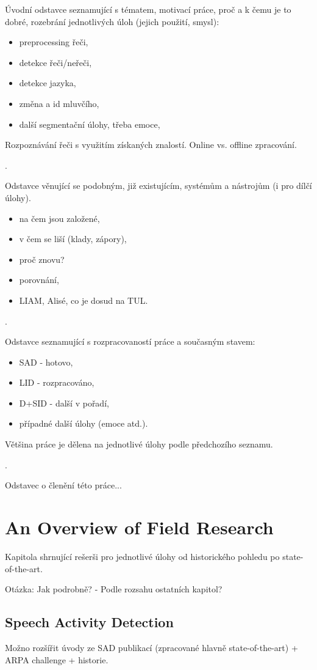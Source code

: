 \documentclass[FM,noheader,EN]{tulthesis}
\begin{document}
Úvodní odstavce seznamující s tématem, motivací práce, proč a k čemu je to dobré, rozebrání jednotlivých úloh (jejich použití, smysl):
\begin{itemize}
	\item preprocessing řeči,
	\item detekce řeči/neřeči,
	\item detekce jazyka,
	\item změna a id mluvčího,
	\item další segmentační úlohy, třeba emoce,
\end{itemize}	
Rozpoznávání řeči s využitím získaných znalostí. Online vs. offline zpracování.

.

Odstavce věnující se podobným, již existujícím, systémům a nástrojům (i pro dílčí úlohy).
\begin{itemize}
	\item na čem jsou založené,
	\item v čem se liší (klady, zápory),
	\item proč znovu?
	\item porovnání,
	\item LIAM, Alisé, co je dosud na TUL.
\end{itemize}	

.

Odstavce seznamující s rozpracovaností práce a současným stavem:
\begin{itemize}
	\item SAD - hotovo,
	\item LID - rozpracováno,
	\item D+SID - další v pořadí,
	\item případné další úlohy (emoce atd.).
\end{itemize}	
Většina práce je dělena na jednotlivé úlohy podle předchozího seznamu.

.

Odstavec o členění této práce...


\chapter{An Overview of Field Research}
\label{ch:theory}
Kapitola shrnující rešerši pro jednotlivé úlohy od historického pohledu po state-of-the-art.

Otázka: Jak podrobně? 
- Podle rozsahu ostatních kapitol?

\section{Speech Activity Detection}
\label{s:theory:sad}
Možno rozšířit úvody ze SAD publikací (zpracované hlavně state-of-the-art) + ARPA challenge + historie.
\end{document}
